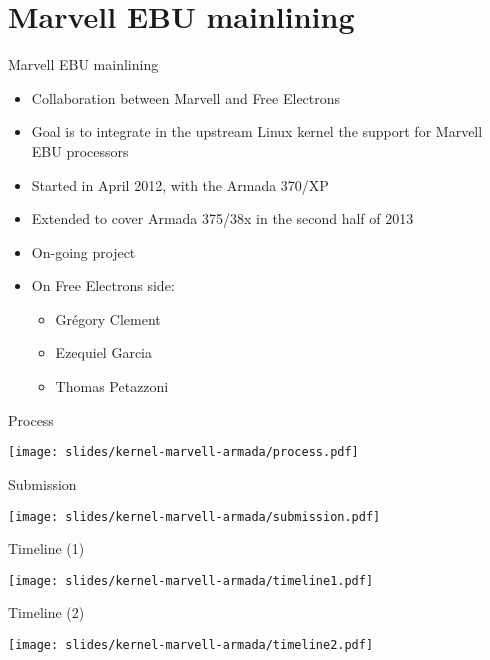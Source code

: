 \section{Marvell EBU mainlining}

\begin{frame}{Marvell EBU mainlining}

\begin{itemize}
\item Collaboration between Marvell and Free Electrons
\item Goal is to integrate in the upstream Linux kernel the support
  for Marvell EBU processors
\item Started in April 2012, with the Armada 370/XP
\item Extended to cover Armada 375/38x in the second half of 2013
\item On-going project
\item On Free Electrons side:
  \begin{itemize}
  \item Grégory Clement
  \item Ezequiel Garcia
  \item Thomas Petazzoni
  \end{itemize}
\end{itemize}

\end{frame}

\begin{frame}{Process}
  \begin{center}
    \texttt{[image: slides/kernel-marvell-armada/process.pdf]}
  \end{center}
\end{frame}

\begin{frame}{Submission}
  \begin{center}
    \texttt{[image: slides/kernel-marvell-armada/submission.pdf]}
  \end{center}
\end{frame}

\begin{frame}{Timeline (1)}
  \begin{center}
    \texttt{[image: slides/kernel-marvell-armada/timeline1.pdf]}
  \end{center}
\end{frame}

\begin{frame}{Timeline (2)}
  \begin{center}
    \texttt{[image: slides/kernel-marvell-armada/timeline2.pdf]}
  \end{center}
\end{frame}

